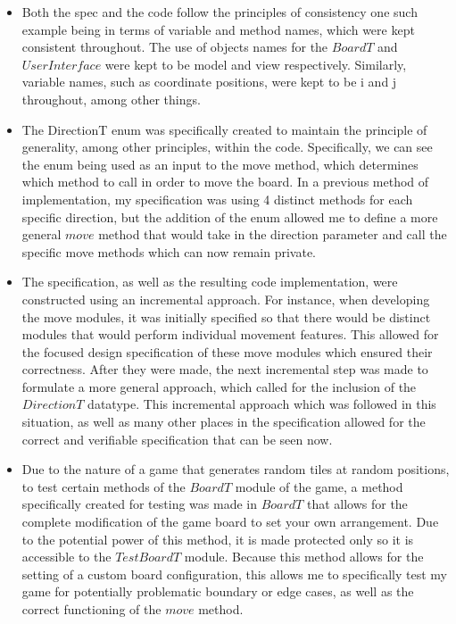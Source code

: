 \documentclass[12pt]{article}
\begin{document}
\begin{itemize}
  \item Both the spec and the code follow the principles of consistency one such example being in terms of variable and method names, which were kept consistent throughout. The use of objects names for the $BoardT$ and $UserInterface$ were kept to be model and view respectively. Similarly, variable names, such as coordinate positions, were kept to be i and j throughout, among other things.

  \item The DirectionT enum was specifically created to maintain the principle of generality, among other principles, within the code. Specifically, we can see the enum being used as an input to the move method, which determines which method to call in order to move the board. In a previous method of implementation, my specification was using 4 distinct methods for each specific direction, but the addition of the enum allowed me to define a more general $move$ method that would take in the direction parameter and call the specific move methods which can now remain private.

  \item The specification, as well as the resulting code implementation, were constructed using an incremental approach. For instance, when developing the move modules, it was initially specified so that there would be distinct modules that would perform individual movement features. This allowed for the focused design specification of these move modules which ensured their correctness. After they were made, the next incremental step was made to formulate a more general approach, which called for the inclusion of the $DirectionT$ datatype. This incremental approach which was followed in this situation, as well as many other places in the specification allowed for the correct and verifiable specification that can be seen now.

  \item Due to the nature of a game that generates random tiles at random positions, to test certain methods of the $BoardT$ module of the game, a method specifically created for testing was made in $BoardT$ that allows for the complete modification of the game board to set your own arrangement. Due to the potential power of this method, it is made protected only so it is accessible to the $TestBoardT$ module. Because this method allows for the setting of a custom board configuration, this allows me to specifically test my game for potentially problematic boundary or edge cases, as well as the correct functioning of the $move$ method.


\end{itemize}
\end{document}
